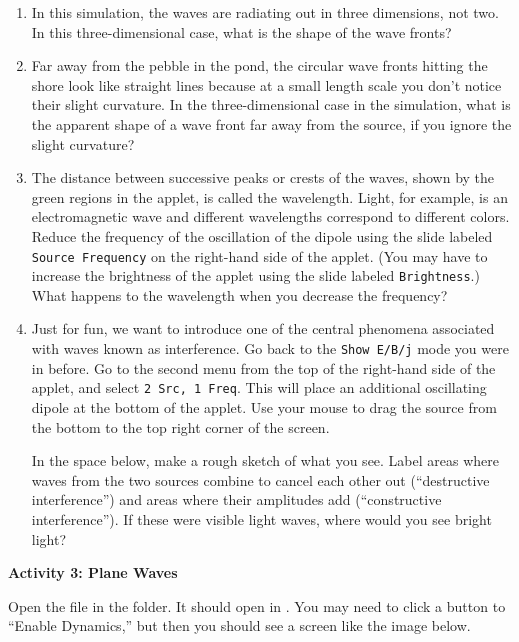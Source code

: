 \begin{enumerate}[labparts]

\item In this simulation, the waves are radiating out in three dimensions, not two.  In this three-dimensional case, what is the shape of the wave fronts?
\answerspace{1cm}

\item Far away from the pebble in the pond, the circular wave fronts hitting the shore look like straight lines because at a small length scale you don't notice their slight curvature. 
In the three-dimensional case in the simulation, what is the apparent shape of a wave front far away from the source, if you ignore the slight curvature?
\answerspace{1cm}


\pagebreak[2]

\item The distance between successive peaks or crests of the waves, shown by the green regions in the
applet, is called the wavelength.  
Light, for example, is an electromagnetic wave and different wavelengths correspond 
to different colors.
Reduce the frequency of the oscillation of the dipole using the slide labeled
\texttt{Source Frequency} on the right-hand side of the applet.
(You may have to increase the brightness of the applet using the slide labeled
\texttt{Brightness}.)
What happens to the wavelength when you decrease the frequency?
\answerspace{1.0cm}


\item Just for fun, we want to introduce one of the central phenomena associated
with waves known as interference.
Go back to the \texttt{Show E/B/j} mode you were in before. 
Go to the second menu from the top of the right-hand side of the applet, and select
\texttt{2 Src, 1 Freq}.
This will place an additional oscillating dipole at the bottom of the applet.  Use your mouse to drag the source from the bottom to the top right corner of the screen.

In the space below, make a rough sketch of what you see.  Label areas where waves from the two sources combine to cancel each other out (``destructive interference'') and areas where their amplitudes add (``constructive interference'').  If these were visible light waves, where would you see bright light?
\answerspace{40mm}

\end{enumerate}

\textbf{Activity 3: Plane Waves}

Open the file  in the \filename{\coursefolder} folder.  It should open in .  You may need to click a button to ``Enable Dynamics,'' but then you should see a screen like the image below.

